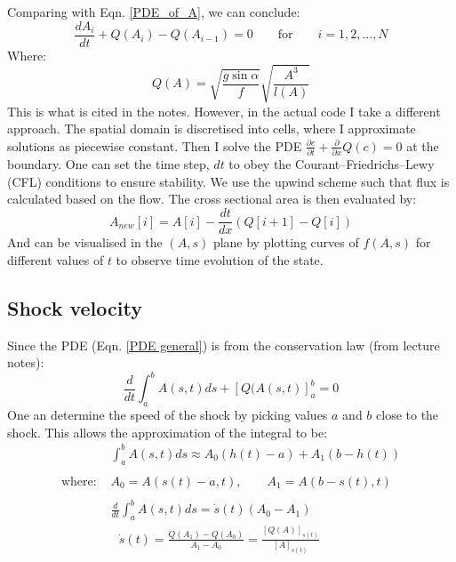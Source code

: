 \documentclass[12pt]{article}
\begin{document}
Comparing with Eqn. \ref{PDE_of_A}, we can conclude:
\begin{equation}
    \frac{dA_i}{dt} + Q(A_i) - Q(A_{i-1}) = 0 \qquad \text{for} \qquad i = 1, 2, ..., N
\end{equation}
Where:
\begin{equation}
    Q(A) = \sqrt{\frac{g\sin\alpha}{f}}\sqrt{\frac{A^3}{l(A)}}
\end{equation}
This is what is cited in the notes. However, in the actual code I take a different approach. The spatial domain is discretised into cells, where I approximate solutions as piecewise constant. Then I solve the PDE $\frac{\partial c}{\partial t} + \frac{\partial}{\partial x}Q(c) = 0$ at the boundary. One can set the time step, $dt$ to obey the Courant–Friedrichs–Lewy (CFL) conditions \cite{courant1967partial} to ensure stability. We use the upwind scheme such that flux is calculated based on the flow. The cross sectional area is then evaluated by:
\begin{equation}
    A_{new}[i] = A[i] - \frac{dt}{dx}(Q[i + 1] - Q[i])
\end{equation}
And can be visualised in the $(A, s)$ plane by plotting curves of $f(A, s)$ for different values of $t$ to observe time evolution of the state.

\subsection{Shock velocity}
Since the PDE (Eqn. \ref{PDE general}) is from the conservation law (from lecture notes):
\begin{equation}
    \frac{d}{dt}\int_a^b A(s, t)ds + [Q(A(s, t)]_a^b = 0
    \label{eqn:conservation_law_oint}
\end{equation}
One an determine the speed of the shock by picking values $a$ and $b$ close to the shock. This allows the approximation of the integral to be:
\begin{equation}
    \begin{split}
        &\int_a^b A(s, t)ds \approx A_0 (h(t) - a) + A_1(b - h(t))
        \\
    \\ \text{where: }& A_0 = A(s(t)-a, t), \qquad A_1 = A(b - s(t),t)
    \\
    \\ &\frac{d}{dt}\int_a^b A(s, t)ds = \dot s(t)(A_0 - A_1)
    \\ &\boxed{\text{ }\dot s(t) = \frac{Q(A_1)- Q(A_0)}{A_1 - A_0} = \frac{[Q(A)]_{s(t)}}{[A]_{s(t)}}\text{ }}
    \end{split}
\end{equation}
\end{document}
